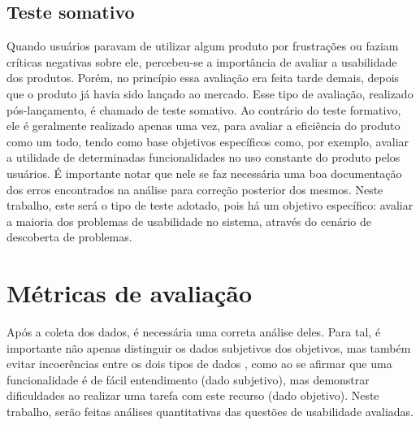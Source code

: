 
\subsection{Teste somativo}
\label{sec:teste-somativo}
    Quando usuários paravam de utilizar algum produto por frustrações ou faziam críticas negativas sobre ele, percebeu-se a importância de avaliar a usabilidade dos produtos. Porém, no princípio essa avaliação era feita tarde demais, depois que o produto já havia sido lançado ao mercado. Esse tipo de avaliação, realizado pós-lançamento, é chamado de teste somativo. 
    Ao contrário do teste formativo, ele é geralmente realizado apenas uma vez, para avaliar a eficiência do produto como um todo, tendo como base objetivos específicos \cite{barnum:01} como, por exemplo, avaliar a utilidade de determinadas funcionalidades no uso constante do produto pelos usuários. É importante notar que nele se faz necessária uma boa documentação dos erros encontrados na análise para correção posterior dos mesmos.
    Neste trabalho, este será o tipo de teste adotado, pois há um objetivo específico: avaliar a maioria dos problemas de usabilidade no sistema, através do cenário de descoberta de problemas.
    
	

\section{Métricas de avaliação}
\label{sec:metricas-avaliacao}
    Após a coleta dos dados, é necessária uma correta análise deles. Para tal, é importante não apenas distinguir os dados subjetivos dos objetivos, mas também evitar incoerências entre os dois tipos de dados \cite{barnum:01}, como ao se afirmar que uma funcionalidade é de fácil entendimento (dado subjetivo), mas demonstrar dificuldades ao realizar uma tarefa com este recurso (dado objetivo).
    Neste trabalho, serão feitas análises quantitativas das questões de usabilidade avaliadas.

